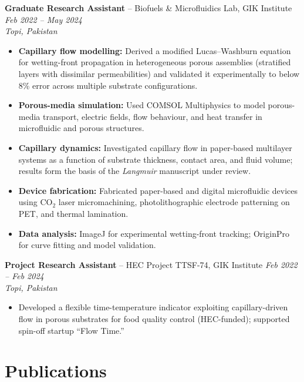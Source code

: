 \documentclass[11pt,a4paper]{article}
\begin{document}
\textbf{Graduate Research Assistant} -- Biofuels \& Microfluidics Lab, GIK Institute
\hfill \textit{Feb 2022 -- May 2024}\\
\textit{Topi, Pakistan}
\begin{itemize}
  \item \textbf{Capillary flow modelling:} Derived a modified Lucas--Washburn
        equation for wetting-front propagation in heterogeneous porous assemblies
        (stratified layers with dissimilar permeabilities) and validated it
        experimentally to below 8\% error across multiple substrate configurations.
  \item \textbf{Porous-media simulation:} Used COMSOL Multiphysics to model
        porous-media transport, electric fields, flow behaviour, and heat transfer
        in microfluidic and porous structures.
  \item \textbf{Capillary dynamics:} Investigated capillary flow in paper-based
        multilayer systems as a function of substrate thickness, contact area, and
        fluid volume; results form the basis of the \textit{Langmuir} manuscript
        under review.
  \item \textbf{Device fabrication:} Fabricated paper-based and digital
        microfluidic devices using CO$_2$ laser micromachining, photolithographic
        electrode patterning on PET, and thermal lamination.
  \item \textbf{Data analysis:} ImageJ for experimental wetting-front tracking;
        OriginPro for curve fitting and model validation.
\end{itemize}

\vspace{4pt}
\textbf{Project Research Assistant} -- HEC Project TTSF-74, GIK Institute
\hfill \textit{Feb 2022 -- Feb 2024}\\
\textit{Topi, Pakistan}
\begin{itemize}
  \item Developed a flexible time-temperature indicator exploiting capillary-driven
        flow in porous substrates for food quality control (HEC-funded); supported
        spin-off startup ``Flow Time.''
\end{itemize}

\section{Publications}
\end{document}
